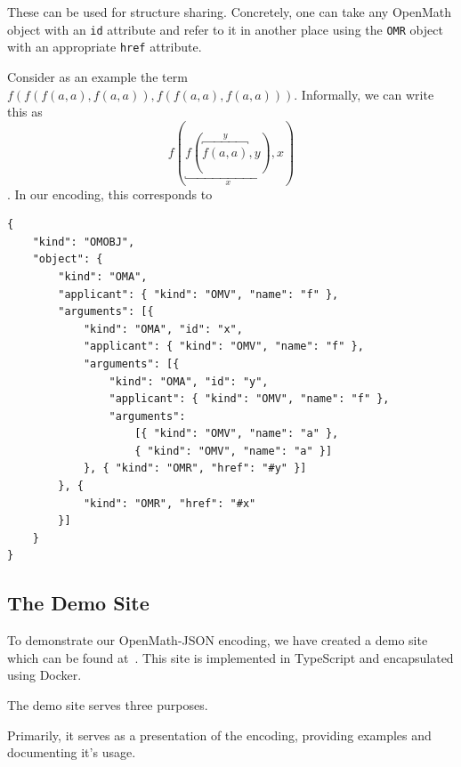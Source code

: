 These can be used for structure sharing. 
Concretely, one can take any OpenMath object with an \texttt{id} attribute and refer to it in another place using the \texttt{OMR} object with an appropriate \texttt{href} attribute. 

Consider as an example the term $f(f(f(a, a), f(a, a)), f(f(a, a), f(a, a)))$. 
Informally, we can write this as $$f(\underbracket {f(\overbracket {f(a, a)}^y, y)}_x, x)$$. 
In our encoding, this corresponds to
\\\begin{minipage}{\linewidth}\begin{lstlisting}
{
    "kind": "OMOBJ",
    "object": {
        "kind": "OMA",
        "applicant": { "kind": "OMV", "name": "f" },
        "arguments": [{ 
            "kind": "OMA", "id": "x",
            "applicant": { "kind": "OMV", "name": "f" },
            "arguments": [{
                "kind": "OMA", "id": "y",
                "applicant": { "kind": "OMV", "name": "f" },
                "arguments": 
                    [{ "kind": "OMV", "name": "a" },
                    { "kind": "OMV", "name": "a" }]
            }, { "kind": "OMR", "href": "#y" }]
        }, {
            "kind": "OMR", "href": "#x" 
        }]
    }
}
\end{lstlisting}\end{minipage}


\subsection{The Demo Site}

To demonstrate our OpenMath-JSON encoding, we have created a demo site which can be found at~\cite{openmathjson:web}. 
This site is implemented in TypeScript and encapsulated using Docker\cite{docker:webpage}. 

The demo site serves three purposes.

Primarily, it serves as a presentation of the encoding, providing examples and documenting it's usage. 

